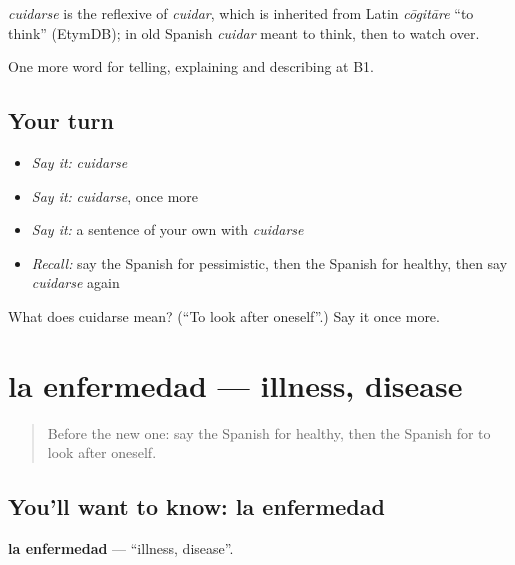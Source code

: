 \begin{cousinweb}
\emph{cuidarse} is the reflexive of \emph{cuidar}, which is inherited from Latin \emph{cōgitāre} \textquotedblleft{}to think\textquotedblright{} (EtymDB); in old Spanish \emph{cuidar} meant to think, then to watch over.
\end{cousinweb}

\begin{grammarlens}[title={What you've built}]
One more word for telling, explaining and describing at B1.
\end{grammarlens}

\subsection*{Your turn}
\begin{itemize}
\raggedright
  \item \emph{Say it:} \emph{cuidarse}
  \item \emph{Say it:} \emph{cuidarse}, once more
  \item \emph{Say it:} a sentence of your own with \emph{cuidarse}
  \item \emph{Recall:} say the Spanish for pessimistic, then the Spanish for healthy, then say \emph{cuidarse} again
\end{itemize}

\begin{tcolorbox}[breakable,colback=teal!4,colframe=teal!35!black,title={Before you move on}]
What does cuidarse mean? (\textquotedblleft{}To look after oneself\textquotedblright{}.) Say it once more.
\end{tcolorbox}
\section[la enfermedad]{la enfermedad — illness, disease}

\label{lesson:ES-C732-enfermedad}



\begin{quote}
Before the new one: say the Spanish for healthy, then the Spanish for to look after oneself.
\end{quote}

\subsection*{You'll want to know: la enfermedad}
\textbf{la enfermedad} — \textquotedblleft{}illness, disease\textquotedblright{}.

